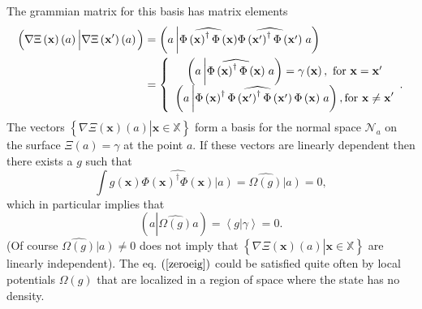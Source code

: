 \documentclass[aps,preprint]{revtex4}%
\begin{document}
The grammian matrix for this basis has matrix elements
\begin{align}
\left(  \overset{}{\nabla\Xi\left(  \mathbf{x}\right)  \left(  a\right)
}\left\vert \overset{}{\nabla\Xi\left(  \mathbf{x}^{\prime}\right)  \left(
a\right)  }\right.  \right)   &  =\left(  a\left\vert \widehat{\Phi\left(
\mathbf{x}\right)  ^{\dagger}\Phi\left(  \mathbf{x}\right)  }\widehat
{\Phi\left(  \mathbf{x}^{\prime}\right)  ^{\dagger}\Phi\left(  \mathbf{x}%
^{\prime}\right)  }\right.  a\right) \nonumber\\
&  =\left\{
\begin{array}
[c]{c}%
\left(  a\left\vert \widehat{\Phi\left(  \mathbf{x}\right)  ^{\dagger}%
\Phi\left(  \mathbf{x}\right)  }\right.  a\right)  =\gamma\left(
\mathbf{x}\right)  ,\text{ for }\mathbf{x=x}^{\prime}\\
\left(  a\left\vert \widehat{\Phi\left(  \mathbf{x}\right)  ^{\dagger}%
\Phi\left(  \mathbf{x}^{\prime}\right)  ^{\dagger}\Phi\left(  \mathbf{x}%
^{\prime}\right)  \Phi\left(  \mathbf{x}\right)  }\right.  a\right)
,\text{for }\mathbf{x\neq x}^{\prime}%
\end{array}
.\right.
\end{align}
The vectors $\left\{  \left.  \overset{}{\nabla\Xi\left(  \mathbf{x}\right)
\left(  a\right)  }\right\vert \mathbf{x\in}\mathbb{X}\right\}  $ form a basis
for the normal space $\mathcal{N}_{a}$ on the surface $\Xi\left(  a\right)
=\gamma$ at the point $a.$ If these vectors are linearly dependent then there
exists a $g$ such that
\begin{equation}
\int g\left(  \mathbf{x}\right)  \widehat{\Phi\left(  \mathbf{x}\right)
^{\dagger}\Phi\left(  \mathbf{x}\right)  }\left\vert \overset{}{a}\right)
=\widehat{\Omega\left(  g\right)  }\left\vert \overset{}{a}\right)  =0,
\label{roeig}%
\end{equation}
which in particular implies that
\begin{equation}
\left(  a\left\vert \widehat{\Omega\left(  g\right)  }\right.  a\right)
=\left\langle \left.  g\right\vert \gamma\right\rangle =0.
\end{equation}
(Of course $\widehat{\Omega\left(  g\right)  }\left\vert \overset{}{a}\right)
\neq0$ does not imply that $\left\{  \left.  \overset{}{\nabla\Xi\left(
\mathbf{x}\right)  \left(  a\right)  }\right\vert \mathbf{x\in}\mathbb{X}%
\right\}  $ are linearly independent). The eq. $\left(  \ref{zeroeig}\right)
$ could be satisfied quite often by local potentials $\Omega\left(  g\right)
$ that are localized in a region of space where the state has no density.
\end{document}
